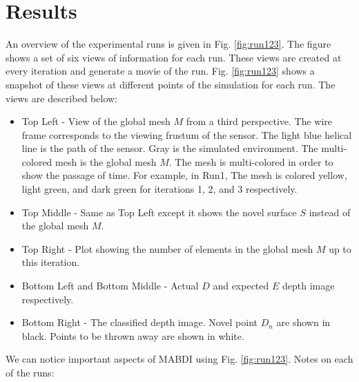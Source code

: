 \section{Results} \label{sec:results}

An overview of the experimental runs is given in Fig. \ref{fig:run123}. The figure shows a set of six views of information for each run. These views are created at every iteration and generate a movie of the run. Fig. \ref{fig:run123} shows a snapshot of these views at different points of the simulation for each run. The views are described below:

\begin{itemize}
  \item Top Left - View of the global mesh $M$ from a third perspective. The
  wire frame corresponds to the viewing frustum of the sensor. The light blue
  helical line is the path of the sensor. Gray is the simulated environment.
  The multi-colored mesh is the global mesh $M$. The mesh is multi-colored in order
  to show the passage of time. For example, in Run1, The mesh is colored yellow,
  light green, and dark green for iterations 1, 2, and 3 respectively.
  \item Top Middle - Same as Top Left except it shows the novel surface $S$ instead of
  the global mesh $M$.
  \item Top Right - Plot showing the number of elements in the global mesh $M$
  up to this iteration.
  \item Bottom Left and Bottom Middle - Actual $D$ and expected $E$ depth image
  respectively.
  \item Bottom Right - The classified depth image. Novel point $D_n$ are shown
  in black. Points to be thrown away are shown in white.
\end{itemize}

We can notice important aspects of MABDI using Fig. \ref{fig:run123}. Notes on each of the runs:

